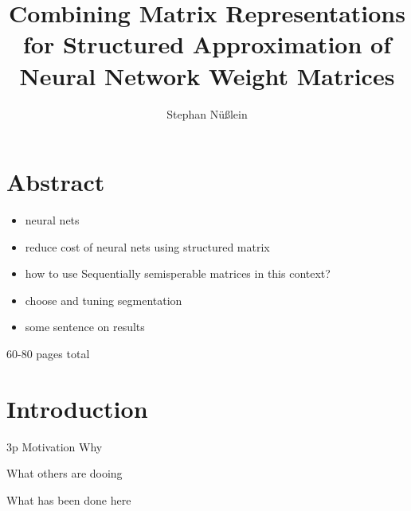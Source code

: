 \documentclass[doctype=mastersthesis,BCOR=15mm,biblatex]{ldvbook}%
\begin{document}
\title{Combining Matrix Representations for Structured Approximation of Neural Network Weight Matrices}
\author{Stephan Nüßlein}


\maketitle[frontcover=Design1]


\chapter*{Abstract}

\begin{itemize}
	\item neural nets
	\item reduce cost of neural nets using structured matrix
	\item how to use Sequentially semisperable matrices in this context?
	\item choose and tuning segmentation
	\item some sentence on results
\end{itemize}


\tableofcontents

60-80 pages total






\chapter{Introduction} 3p
Motivation Why

What others are dooing

What has been done here
\end{document}
